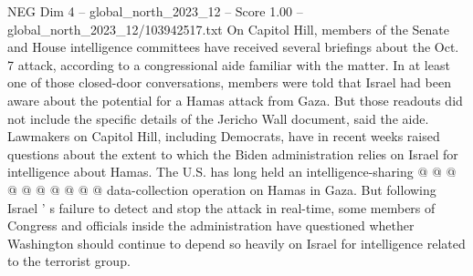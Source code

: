 \begin{textsample}{NEG Dim 4 – global\_north\_2023\_12 – Score 1.00 – global\_north\_2023\_12/103942517.txt}
On Capitol Hill, members of the Senate and House intelligence committees have received several briefings about the Oct. 7 attack, according to a congressional aide familiar with the matter.
In at least one of those closed-door conversations, members were told that Israel had been aware about the potential for a Hamas attack from Gaza.
But those readouts did not include the specific details of the Jericho Wall document, said the aide.
Lawmakers on Capitol Hill, including Democrats, have in recent weeks raised questions about the extent to which the Biden administration relies on Israel for intelligence about Hamas.
The U.S. has long held an intelligence-sharing @ @ @ @ @ @ @ @ @ @ data-collection operation on Hamas in Gaza.
But following Israel ' s failure to detect and stop the attack in real-time, some members of Congress and officials inside the administration have questioned whether Washington should continue to depend so heavily on Israel for intelligence related to the terrorist group.

\end{textsample}
